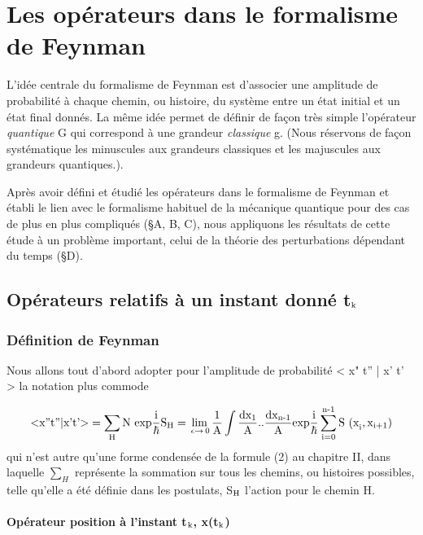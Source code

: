 
\chapter{Les opérateurs dans le formalisme de Feynman} %

L'idée centrale du formalisme de Feynman est d'associer une
amplitude de probabilité à chaque chemin, ou histoire, du système entre
un état initial et un état final donnés. La même idée permet de définir
de façon très simple l'opérateur {\it quantique} G qui correspond à une grandeur
{\it classique} g. (Nous réservons de façon systématique les minuscules aux
grandeurs classiques et les majuscules aux grandeurs quantiques.).

Après avoir défini et étudié les opérateurs dans le formalisme
de Feynman et établi le lien avec le formalisme habituel de la mécanique
quantique pour des cas de plus en plus compliqués (\S A, B, C), nous
appliquons les résultats de cette étude à un problème important, celui de la
théorie des perturbations dépendant du temps (\S D).

\section{Opérateurs relatifs à un instant donné t$_{\text{k}}$}
\subsection{Définition de Feynman} %

Nous allons tout d'abord adopter pour l'amplitude de probabilité < x" t'' | x' t' > la notation plus commode

\[
\text{<x''t''|x't'>} = \sum_{\text{H}} \text{N exp} \frac{\text{i}}{\hbar} \text{S}_{\text{H}} =
\lim_{\,\epsilon \to \,0} \frac{1}{\text{A}}
\int \frac{\text{dx}_1}{\text{A}}..\frac{\text{dx}_{\text{n-1}}}{\text{A}}
\text{exp} \frac{\text{i}}{\hbar} \sum_{\text{i=0}}^{\text{n-1}}
\text{S (x}_{\text{i}}, \text{x}_{\text{i+1}})
\]
qui n'est autre qu'une forme condensée de la formule (2) au chapitre II, dans
laquelle $\sum_{H}$ représente la sommation sur tous les chemins, ou histoires 
possibles, telle qu'elle a été définie dans les postulats, S$_{\text{H}}$ l'action 
pour le chemin H.
\subsubsection{Opérateur position à l'instant t$_{\text{k}}$, x(t$_{\text{k}}$)}%

